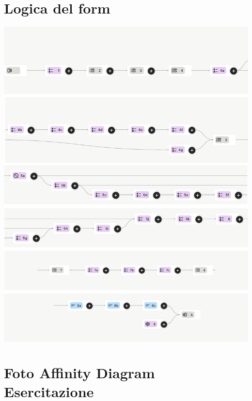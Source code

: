 \documentclass{article}
\begin{document}
\section{Logica del form}

\vspace*{\fill}
\begin{center}
    \includegraphics[width=\textwidth]{form_logic.png} %
\end{center}
\vspace*{\fill}
\newpage

\section{Foto Affinity Diagram Esercitazione}
\end{document}
